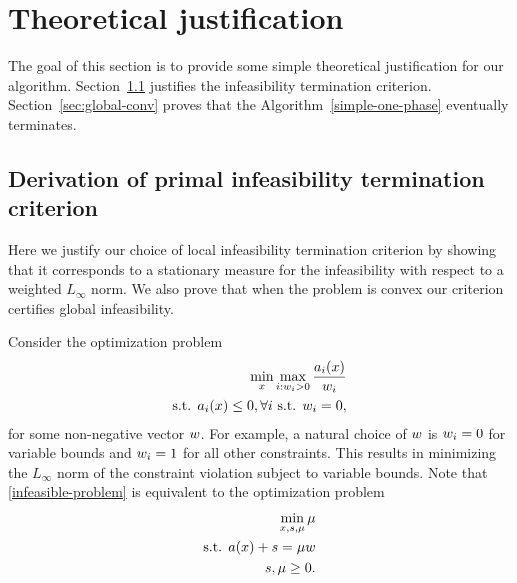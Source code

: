 \documentclass{article}
\begin{document}
\section{Theoretical justification}\label{sec:theory}

The goal of this section is to provide some simple theoretical justification for our algorithm. Section~\ref{sec:infeas-criteron-justify} justifies the infeasibility termination criterion. Section~\ref{sec:global-conv} proves that the Algorithm~\ref{simple-one-phase} eventually terminates. 

\subsection{Derivation of primal infeasibility termination criterion} \label{sec:infeas-criteron-justify}

Here we justify our choice of local infeasibility termination criterion by showing that it corresponds to a stationary measure for the infeasibility with respect to a weighted $L_{\infty}$ norm. We also prove that when the problem is convex our criterion certifies global infeasibility.

Consider the optimization problem
\begin{subequations}\label{infeasible-problem}
\begin{flalign}
\min_{x} \max_{i : w_i > 0}{ \frac{a_i(x)}{ w_i }  }  \\
\text{s.t. } a_i(x) \le 0, \forall i \text{ s.t. } w_i = 0,
\end{flalign}
\end{subequations}
for some non-negative vector $w$. For example, a natural choice of $w$ is $w_i = 0$ for variable bounds and $w_i = 1$ for all other constraints. This results in minimizing the $L_{\infty}$ norm of the constraint violation subject to variable bounds. Note that \eqref{infeasible-problem} is equivalent to the optimization problem
\begin{subequations}\label{feas-problem}
\begin{flalign}
\min_{x,s,\mu} \mu \\
\text{s.t. } a(x) + s = \mu w \\
s, \mu \ge 0.
\end{flalign}
\end{subequations}
\end{document}
